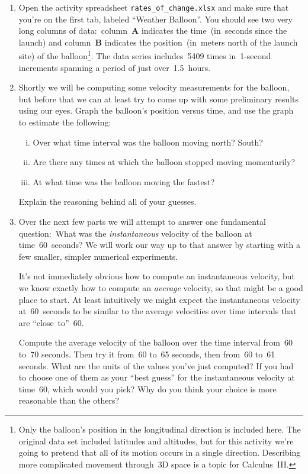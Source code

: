 \begin{enumerate}[\bf {\thesection}a.]
	\item Open the activity spreadsheet \verb|rates_of_change.xlsx| and make sure that you're on the first tab, labeled ``Weather Balloon''. You should see two very long columns of data:~column~\textbf{A} indicates the time~(in~seconds since the launch) and column~\textbf{B} indicates the position~(in~meters north of the launch site) of the balloon\footnote{Only the balloon's position in the longitudinal direction is included here. The original data set included latitudes and altitudes, but for this activity we're going to pretend that all of its motion occurs in a single direction. Describing more complicated movement through~3D space is a topic for Calculus~III.}. The data series includes~5409 times in~1-second increments spanning a period of just over~1.5~hours.
	
	\item Shortly we will be computing some velocity measurements for the balloon, but before that we can at least try to come up with some preliminary results using our eyes. Graph the balloon's position versus time, and use the graph to estimate the following:
	\begin{enumerate}[i.]
		\item Over what time interval was the balloon moving north? South?
		\item Are there any times at which the balloon stopped moving momentarily?
		\item At what time was the balloon moving the fastest?
	\end{enumerate}
	
	Explain the reasoning behind all of your guesses.
	
	\item Over the next few parts we will attempt to answer one fundamental question:~What was the \textit{instantaneous} velocity of the balloon at time~60~seconds? We will work our way up to that answer by starting with a few smaller, simpler numerical experiments.
	
	It's not immediately obvious how to compute an instantaneous velocity, but we know exactly how to compute an \textit{average} velocity, so that might be a good place to start. At least intuitively we might expect the instantaneous velocity at~60~seconds to be similar to the average velocities over time intervals that are ``close~to''~60.
	
	Compute the average velocity of the balloon over the time interval from~60 to~70 seconds. Then try it from~60 to~65 seconds, then from~60 to~61 seconds. What are the units of the values you've just computed? If you had to choose one of them as your ``best guess'' for the instantaneous velocity at time~60, which would you pick? Why do you think your choice is more reasonable than the others?
	

\end{enumerate}
